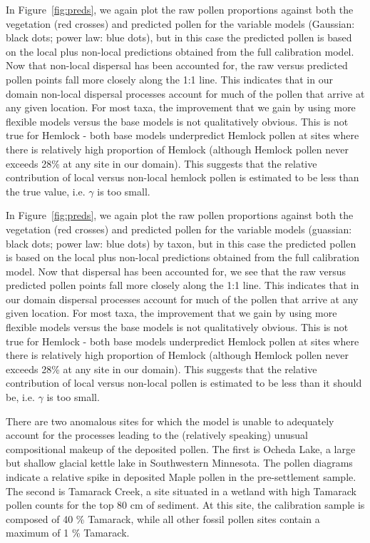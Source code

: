 \documentclass[12pt]{article}
\begin{document}
In Figure~\ref{fig:preds}, we again plot the raw pollen proportions
against both the vegetation (red crosses) and predicted pollen for the
variable models (Gaussian: black dots; power law: blue dots), but in
this case the predicted pollen is based on the local plus non-local
predictions obtained from the full calibration model. Now that
non-local dispersal has been accounted for, the raw versus predicted
pollen points fall more closely along the 1:1 line. This indicates
that in our domain non-local dispersal processes account for much of
the pollen that arrive at any given location. For most taxa, the
improvement that we gain by using more flexible models versus the base
models is not qualitatively obvious. This is not true for Hemlock -
both base models underpredict Hemlock pollen at sites where there is
relatively high proportion of Hemlock (although Hemlock pollen never
exceeds 28\% at any site in our domain). This suggests that the
relative contribution of local versus non-local hemlock pollen is
estimated to be less than the true value, i.e. $\gamma$ is too small.


In Figure~\ref{fig:preds}, we again plot the raw pollen proportions
against both the vegetation (red crosses) and predicted pollen for the
variable models (guassian: black dots; power law: blue dots) by taxon,
but in this case the predicted pollen is based on the local plus
non-local predictions obtained from the full calibration model. Now
that dispersal has been accounted for, we see that the raw versus
predicted pollen points fall more closely along the 1:1 line. This
indicates that in our domain dispersal processes account for much of
the pollen that arrive at any given location. For most taxa, the
improvement that we gain by using more flexible models versus the base
models is not qualitatively obvious. This is not true for Hemlock -
both base models underpredict Hemlock pollen at sites where there is
relatively high proportion of Hemlock (although Hemlock pollen never
exceeds 28\% at any site in our domain). This suggests that the
relative contribution of local versus non-local pollen is estimated to
be less than it should be, i.e. $\gamma$ is too small.

There are two anomalous sites for which the model is unable to
adequately account for the processes leading to the (relatively
speaking) unusual compositional makeup of the deposited pollen. The
first is Ocheda Lake, a large but shallow glacial kettle lake in
Southwestern Minnesota. The pollen diagrams indicate a relative spike
in deposited Maple pollen in the pre-settlement sample. The second is
Tamarack Creek, a site situated in a wetland with high Tamarack pollen
counts for the top 80 cm of sediment. At this site, the calibration
sample is composed of 40 \% Tamarack, while all other fossil pollen
sites contain a maximum of 1 \% Tamarack.
\end{document}
